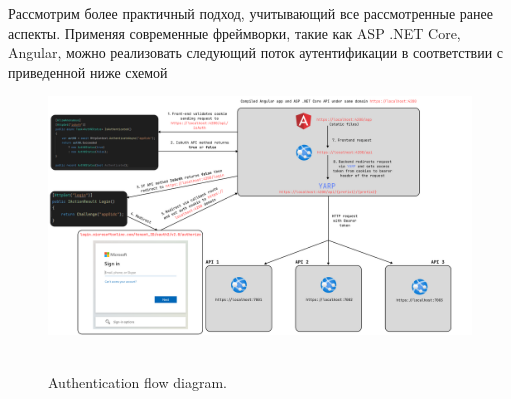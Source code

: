 Рассмотрим более практичный подход, учитывающий все рассмотренные ранее аспекты.
Применяя современные фреймворки, такие как ASP .NET Core, Angular, можно реализовать следующий поток аутентификации в соответствии с приведенной ниже схемой
\begin{figure}[H]
    \centering
    \includegraphics[width=1\textwidth]{img/Auth_flow_updated}
    ~\caption{Authentication flow diagram.}
\end{figure}

